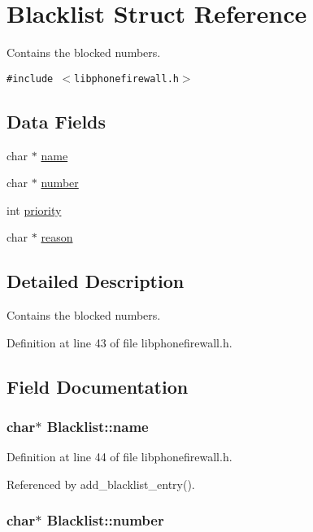 \hypertarget{structBlacklist}{
\section{Blacklist Struct Reference}
\label{structBlacklist}
}
Contains the blocked numbers.  


{\tt \#include $<$libphonefirewall.h$>$}

\subsection*{Data Fields}
\begin{CompactItemize}
\item 
char $\ast$ \hyperlink{structBlacklist_85e3b3043e9490ab2851dea24e456104}{name}
\item 
char $\ast$ \hyperlink{structBlacklist_110cfabadd75ee3c1305f48ac4d49c62}{number}
\item 
int \hyperlink{structBlacklist_a5370eb6240b6e528ce56fb10d7e9249}{priority}
\item 
char $\ast$ \hyperlink{structBlacklist_4aaebfcc863267f326258e0622bf7303}{reason}
\end{CompactItemize}


\subsection{Detailed Description}
Contains the blocked numbers. 

Definition at line 43 of file libphonefirewall.h.

\subsection{Field Documentation}
\hypertarget{structBlacklist_85e3b3043e9490ab2851dea24e456104}{
\subsubsection{\setlength{\rightskip}{0pt plus 5cm}char$\ast$ {\bf Blacklist::name}}}
\label{structBlacklist_85e3b3043e9490ab2851dea24e456104}




Definition at line 44 of file libphonefirewall.h.

Referenced by add\_\-blacklist\_\-entry().\hypertarget{structBlacklist_110cfabadd75ee3c1305f48ac4d49c62}{
\subsubsection{\setlength{\rightskip}{0pt plus 5cm}char$\ast$ {\bf Blacklist::number}}}
\label{structBlacklist_110cfabadd75ee3c1305f48ac4d49c62}




